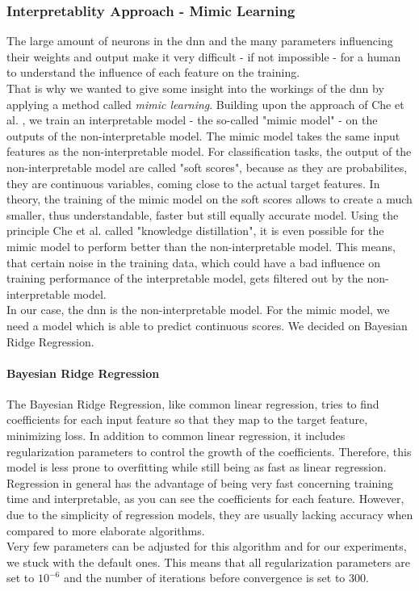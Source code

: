 \documentclass[conference,comsoc]{IEEEtran}
\begin{document}
\subsubsection{Interpretablity Approach - Mimic Learning}
The large amount of neurons in the \gls{dnn} and the many parameters influencing their weights and output make it very difficult - if not impossible - for a human to understand the influence of each feature on the training. \\
That is why we wanted to give some insight into the workings of the \gls{dnn} by applying a method called \emph{mimic learning}. 
Building upon the approach of Che et al. \cite{Che2016}, we train an interpretable model - the so-called "mimic model" - on the outputs of the non-interpretable model.
The mimic model takes the same input features as the non-interpretable model.
For classification tasks, the output of the non-interpretable model are called "soft scores", because as they are probabilites, they are continuous variables, coming close to the actual target features.
In theory, the training of the mimic model on the soft scores allows to create a much smaller, thus understandable, faster but still equally accurate model.
Using the principle Che et al. called "knowledge distillation", it is even possible for the mimic model to perform better than the non-interpretable model.
This means, that certain noise in the training data, which could have a bad influence on training performance of the interpretable model, gets filtered out by the non-interpretable model. \\
In our case, the \gls{dnn} is the non-interpretable model.
For the mimic model, we need a model which is able to predict continuous scores.
We decided on Bayesian Ridge Regression.
\paragraph*{Bayesian Ridge Regression}
The Bayesian Ridge Regression, like common linear regression, tries to find coefficients for each input feature so that they map to the target feature, minimizing loss.
In addition to common linear regression, it includes regularization parameters to control the growth of the coefficients.
Therefore, this model is less prone to overfitting while still being as fast as linear regression. \\
Regression in general has the advantage of being very fast concerning training time and interpretable, as you can see the coefficients for each feature.
However, due to the simplicity of regression models, they are usually lacking accuracy when compared to more elaborate algorithms. \\
Very few parameters can be adjusted for this algorithm and for our experiments, we stuck with the default ones.
This means that all regularization parameters are set to $10^{-6}$ and the number of iterations before convergence is set to 300.
\end{document}
